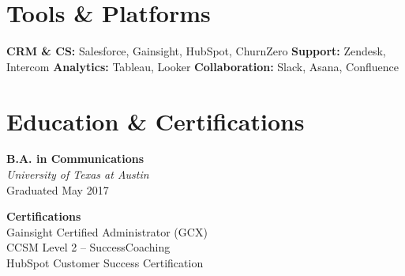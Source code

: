 \documentclass[10pt]{article}
\begin{document}
\section*{Tools \& Platforms}
\vspace{-3pt}
\textbf{CRM \& CS:} Salesforce, Gainsight, HubSpot, ChurnZero \quad\textbullet\quad
\textbf{Support:} Zendesk, Intercom \quad\textbullet\quad
\textbf{Analytics:} Tableau, Looker \quad\textbullet\quad
\textbf{Collaboration:} Slack, Asana, Confluence

\section*{Education \& Certifications}
\vspace{-3pt}
\begin{minipage}[t]{0.55\linewidth}
  \textbf{B.A. in Communications} \\
  {\color{csmteal}\itshape University of Texas at Austin} \\
  {\small\color{gray500} Graduated May 2017}
\end{minipage}\hfill
\begin{minipage}[t]{0.42\linewidth}
  \textbf{Certifications} \\
  {\small
    Gainsight Certified Administrator (GCX) \\
    CCSM Level 2 -- SuccessCoaching \\
    HubSpot Customer Success Certification
  }
\end{minipage}
\end{document}
